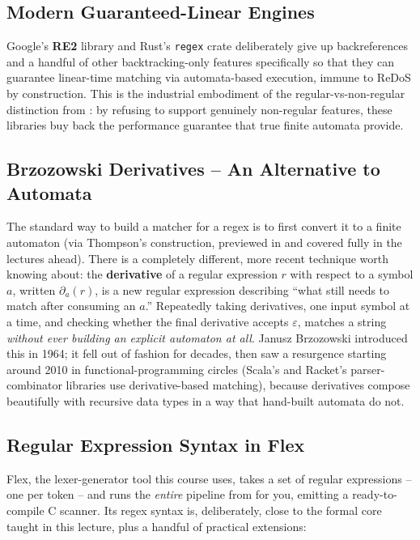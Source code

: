 \documentclass[full-course-notes.tex]{subfiles}
\begin{document}
\subsection{Modern Guaranteed-Linear Engines}

Google's \textbf{RE2} library and Rust's \texttt{regex} crate deliberately give up
backreferences and a handful of other backtracking-only features specifically so that they can
guarantee linear-time matching via automata-based execution, immune to ReDoS by construction.
This is the industrial embodiment of the regular-vs-non-regular distinction from
: by refusing to support genuinely non-regular features,
these libraries buy back the performance guarantee that true finite automata provide.

\subsection{Brzozowski Derivatives -- An Alternative to Automata}

The standard way to build a matcher for a regex is to first convert it to a finite automaton
(via Thompson's construction, previewed in  and covered fully in the
lectures ahead). There is a completely different, more recent technique worth knowing about:
the \textbf{derivative} of a regular expression $r$ with respect to a symbol $a$, written
$\partial_a(r)$, is a new regular expression describing ``what still needs to match after
consuming an $a$.'' Repeatedly taking derivatives, one input symbol at a time, and checking
whether the final derivative accepts $\varepsilon$, matches a string \emph{without ever
building an explicit automaton at all}. Janusz Brzozowski introduced this in 1964; it fell out
of fashion for decades, then saw a resurgence starting around 2010 in functional-programming
circles (Scala's and Racket's parser-combinator libraries use derivative-based matching),
because derivatives compose beautifully with recursive data types in a way that hand-built
automata do not.

\subsection{Regular Expression Syntax in Flex}
\label{sec:l3-flex-syntax}

Flex, the lexer-generator tool this course uses, takes a set of regular expressions -- one per
token -- and runs the \emph{entire} pipeline from  for you, emitting a
ready-to-compile C scanner. Its regex syntax is, deliberately, close to the formal core taught
in this lecture, plus a handful of practical extensions:
\end{document}
